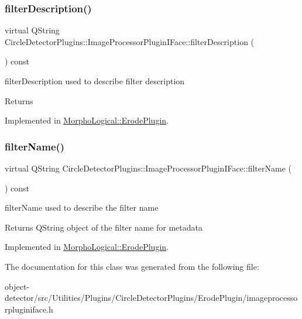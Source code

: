 \subsubsection{\texorpdfstring{filter\+Description()}{filterDescription()}}
{\footnotesize\ttfamily virtual Q\+String Circle\+Detector\+Plugins\+::\+Image\+Processor\+Plugin\+I\+Face\+::filter\+Description (\begin{DoxyParamCaption}{ }\end{DoxyParamCaption}) const\hspace{0.3cm}{\ttfamily [pure virtual]}}



filter\+Description used to describe filter description 

\begin{DoxyReturn}{Returns}

\end{DoxyReturn}


Implemented in \hyperlink{class_morpho_logical_1_1_erode_plugin_a11da98b723970e68dae002337ac36875}{Morpho\+Logical\+::\+Erode\+Plugin}.

\mbox{\label{class_circle_detector_plugins_1_1_image_processor_plugin_i_face_a278e7f8e8c7e50e566c65202de58d037}} 
\subsubsection{\texorpdfstring{filter\+Name()}{filterName()}}
{\footnotesize\ttfamily virtual Q\+String Circle\+Detector\+Plugins\+::\+Image\+Processor\+Plugin\+I\+Face\+::filter\+Name (\begin{DoxyParamCaption}{ }\end{DoxyParamCaption}) const\hspace{0.3cm}{\ttfamily [pure virtual]}}



filter\+Name used to describe the filter name 

\begin{DoxyReturn}{Returns}
Q\+String object of the filter name for metadata 
\end{DoxyReturn}


Implemented in \hyperlink{class_morpho_logical_1_1_erode_plugin_a7c3de038d5f2451861c021158c942aab}{Morpho\+Logical\+::\+Erode\+Plugin}.



The documentation for this class was generated from the following file\+:\begin{DoxyCompactItemize}
\item 
object-\/detector/src/\+Utilities/\+Plugins/\+Circle\+Detector\+Plugins/\+Erode\+Plugin/imageprocessorpluginiface.\+h\end{DoxyCompactItemize}
